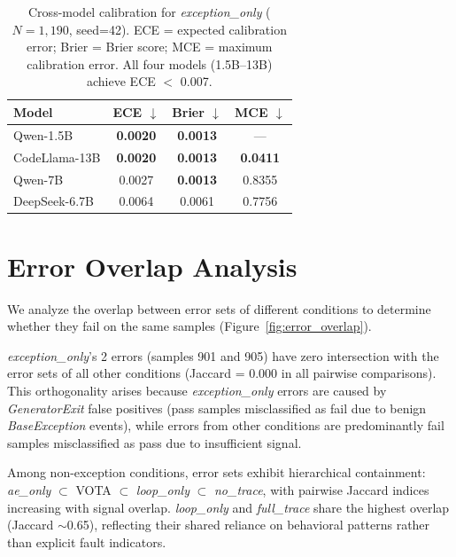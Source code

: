 \begin{table}[h!]
\centering
\caption{Cross-model calibration for \textit{exception\_only} ($N{=}1{,}190$, seed=42). ECE = expected calibration error; Brier = Brier score; MCE = maximum calibration error. All four models (1.5B--13B) achieve ECE ${<}$ 0.007.}
\label{tab:calibration_cross}
\small
\begin{tabular}{lccc}
\toprule
\textbf{Model} & \textbf{ECE $\downarrow$} & \textbf{Brier $\downarrow$} & \textbf{MCE $\downarrow$} \\
\midrule
Qwen-1.5B & \textbf{0.0020} & \textbf{0.0013} & --- \\
CodeLlama-13B & \textbf{0.0020} & \textbf{0.0013} & \textbf{0.0411} \\
Qwen-7B & 0.0027 & \textbf{0.0013} & 0.8355 \\
DeepSeek-6.7B & 0.0064 & 0.0061 & 0.7756 \\
\bottomrule
\end{tabular}
\end{table}


\section{Error Overlap Analysis}
\label{sec:error_overlap}

We analyze the overlap between error sets of different conditions to determine whether they fail on the same samples (Figure~\ref{fig:error_overlap}).

\textit{exception\_only}'s 2 errors (samples 901 and 905) have zero intersection with the error sets of all other conditions (Jaccard = 0.000 in all pairwise comparisons).
This orthogonality arises because \textit{exception\_only} errors are caused by \textit{GeneratorExit} false positives (pass samples misclassified as fail due to benign \textit{BaseException} events), while errors from other conditions are predominantly fail samples misclassified as pass due to insufficient signal.

Among non-exception conditions, error sets exhibit hierarchical containment: \textit{ae\_only} $\subset$ VOTA $\subset$ \textit{loop\_only} $\subset$ \textit{no\_trace}, with pairwise Jaccard indices increasing with signal overlap.
\textit{loop\_only} and \textit{full\_trace} share the highest overlap (Jaccard ${\sim}$0.65), reflecting their shared reliance on behavioral patterns rather than explicit fault indicators.

